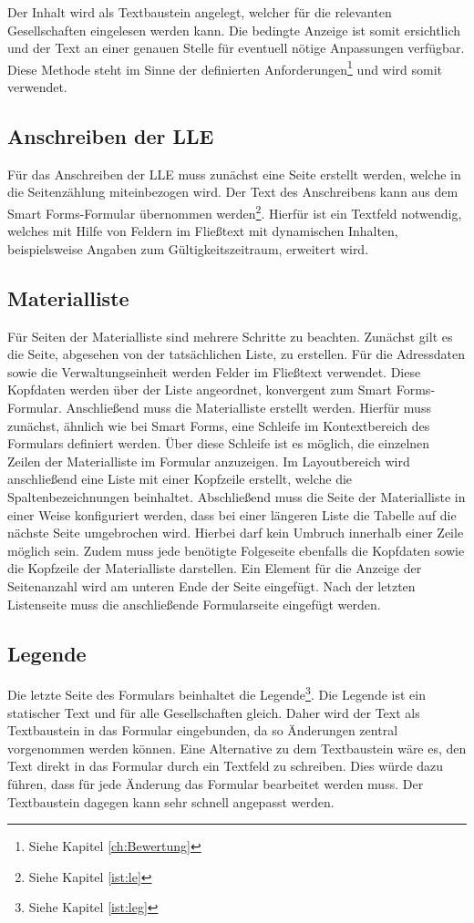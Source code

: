 Der Inhalt wird als Textbaustein angelegt, welcher für die relevanten Gesellschaften eingelesen werden kann. Die bedingte Anzeige ist somit ersichtlich und der Text an einer genauen Stelle für eventuell nötige Anpassungen verfügbar.
Diese Methode steht im Sinne der definierten Anforderungen\footnote{Siehe Kapitel \ref{ch:Bewertung}} und wird somit verwendet. 

\subsection{Anschreiben der \acs{LLE}}

Für das Anschreiben der \ac{LLE} muss zunächst eine Seite erstellt werden, welche in die Seitenzählung miteinbezogen wird. Der Text des Anschreibens kann aus dem Smart Forms-Formular übernommen werden\footnote{Siehe Kapitel \ref{ist:le}}. Hierfür ist ein Textfeld notwendig, welches mit Hilfe von Feldern im Fließtext mit dynamischen Inhalten, beispielsweise Angaben zum Gültigkeitszeitraum, erweitert wird. 

\subsection{Materialliste}

Für Seiten der Materialliste sind mehrere Schritte zu beachten. Zunächst gilt es die Seite, abgesehen von der tatsächlichen Liste, zu erstellen. Für die Adressdaten sowie die Verwaltungseinheit werden Felder im Fließtext verwendet. Diese Kopfdaten werden über der Liste angeordnet, konvergent zum Smart Forms-Formular. Anschließend muss die Materialliste erstellt werden. Hierfür muss zunächst, ähnlich wie bei Smart Forms, eine Schleife im Kontextbereich des Formulars definiert werden. Über diese Schleife ist es möglich, die einzelnen Zeilen der Materialliste im Formular anzuzeigen. Im Layoutbereich wird anschließend eine Liste mit einer Kopfzeile  erstellt, welche die Spaltenbezeichnungen beinhaltet. Abschließend muss die Seite der Materialliste in einer Weise konfiguriert werden, dass bei einer längeren Liste die Tabelle auf die nächste Seite umgebrochen wird. Hierbei darf kein Umbruch innerhalb einer Zeile möglich sein. Zudem muss jede benötigte Folgeseite ebenfalls die Kopfdaten sowie die Kopfzeile der Materialliste darstellen. Ein Element für die Anzeige der Seitenanzahl wird am unteren Ende der Seite eingefügt. Nach der letzten Listenseite muss die anschließende Formularseite eingefügt werden.

\subsection{Legende}
Die letzte Seite des Formulars beinhaltet die Legende\footnote{Siehe Kapitel \ref{ist:leg}}.
Die Legende ist ein statischer Text und für alle Gesellschaften gleich. Daher wird der Text als Textbaustein in das Formular eingebunden, da so Änderungen zentral vorgenommen werden können. Eine Alternative zu dem Textbaustein wäre es, den Text direkt in das Formular durch ein Textfeld zu schreiben. Dies würde dazu führen, dass für jede Änderung das Formular bearbeitet werden muss. Der Textbaustein dagegen kann sehr schnell angepasst werden.



